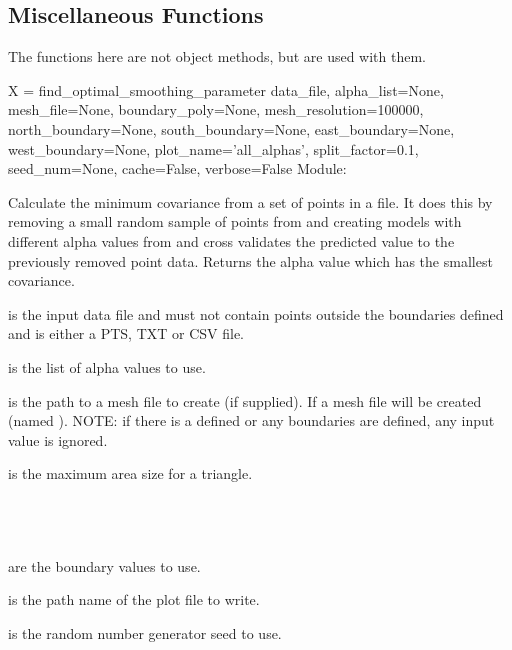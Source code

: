\documentclass{manual}
\begin{document}
\subsection{Miscellaneous Functions}

The functions here are not  object methods, but are used with them.

\begin{methoddesc}{X = find_optimal_smoothing_parameter}
                  {data_file,
                   alpha_list=None,
                   mesh_file=None,
                   boundary_poly=None,
                   mesh_resolution=100000,
                   north_boundary=None,
                   south_boundary=None,
                   east_boundary=None,
                   west_boundary=None,
                   plot_name='all_alphas',
                   split_factor=0.1,
                   seed_num=None,
                   cache=False,
                   verbose=False}
Module: 

Calculate the minimum covariance from a set of points in a file.  It does this
by removing a small random sample of points from  and creating
models with different alpha values from  and cross validates
the predicted value to the previously removed point data. Returns the
alpha value which has the smallest covariance.

 is the input data file and must not contain points outside
the boundaries defined and is either a PTS, TXT or CSV file.

 is the list of alpha values to use.

 is the path to a mesh file to create (if supplied).
If  a mesh file will be created (named ).
NOTE: if there is a  defined or any boundaries are defined,
any input  value is ignored.

 is the maximum area size for a triangle.

\\
\\
\\
 are the boundary values to use.

 is the path name of the plot file to write.

 is the random number generator seed to use.


\end{methoddesc}
\end{document}
